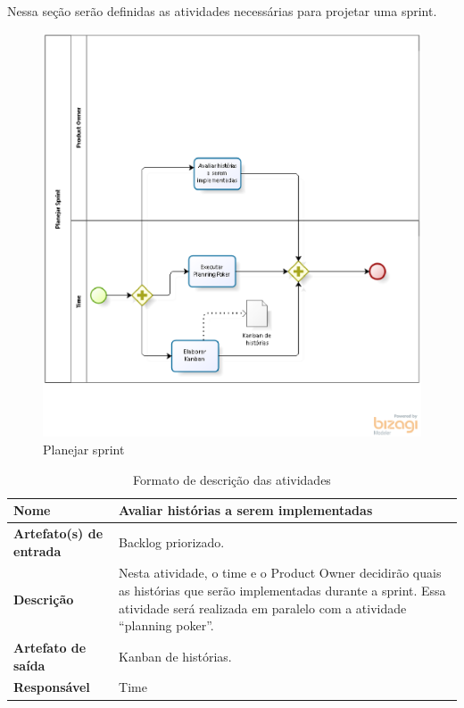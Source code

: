 Nessa seção serão definidas as atividades necessárias para projetar uma sprint.
\begin{figure}[H]
    \centering
    \caption{Planejar sprint}
    \label{processoPlanejar}
    \includegraphics[keepaspectratio=true,scale=0.5]{figuras/processoPlanejar.eps}
\end{figure}

\begin{table}[h]
    \centering
    \label{descricaoAtividades}
    \caption{Formato de descrição das atividades}
        \begin{tabular}{|l|p{10cm}|}
        \hline
        \textbf{Nome} & Avaliar histórias a serem implementadas \\
        \hline
        \textbf{Artefato(s) de entrada} & Backlog priorizado. \\
        \hline
        \textbf{Descrição} & Nesta atividade, o time e o Product Owner decidirão quais as histórias que serão implementadas durante a sprint. Essa atividade será realizada em paralelo com a atividade “planning poker”. \\
        \hline
        \textbf{Artefato de saída} & Kanban de histórias. \\
        \hline
        \textbf{Responsável} & Time \\
        \hline
    \end{tabular}
\end{table}

